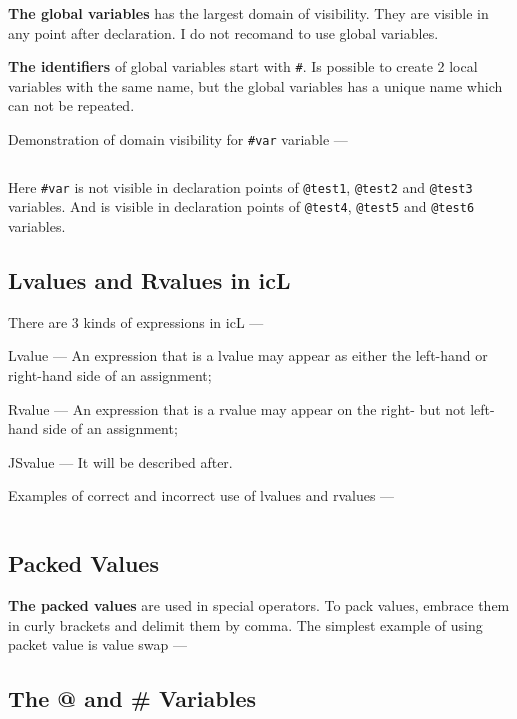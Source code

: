 \textbf{The global variables} has the largest domain of visibility. They are visible in any point after declaration. I do not recomand to use global variables.

{\bf The identifiers} of global variables start with \texttt{#}. Is possible to create 2 local variables with the same name, but the global variables has a unique name which can not be repeated.

Demonstration of domain visibility for \texttt{#var} variable —
\inputminted[linenos]{icl}{../sources/globalvars.icL}

Here \texttt{#var} is not visible in declaration points of \texttt{@test1}, \texttt{@test2} and \texttt{@test3} variables. And is visible in declaration points of \texttt{@test4}, \texttt{@test5} and \texttt{@test6} variables.

\subsection{Lvalues and Rvalues in icL}

There are 3 kinds of expressions in icL —

\begin{icEnum}
\item
	Lvalue — An expression that is a lvalue may appear as either the left-hand or right-hand side of an assignment;
\item
	Rvalue — An expression that is a rvalue may appear on the right- but not left-hand side of an assignment;
\item
	JSvalue — It will be described after.
\end{icEnum}
Examples of correct and incorrect use of lvalues and rvalues —
\inputminted[linenos]{icl}{../sources/rlvalues.icL}

\subsection{Packed Values}

{\bf The packed values} are used in special operators. To pack values, embrace them in curly brackets and delimit them by comma. The simplest example of using packet value is value swap —

\subsection{The @ and \# Variables}

